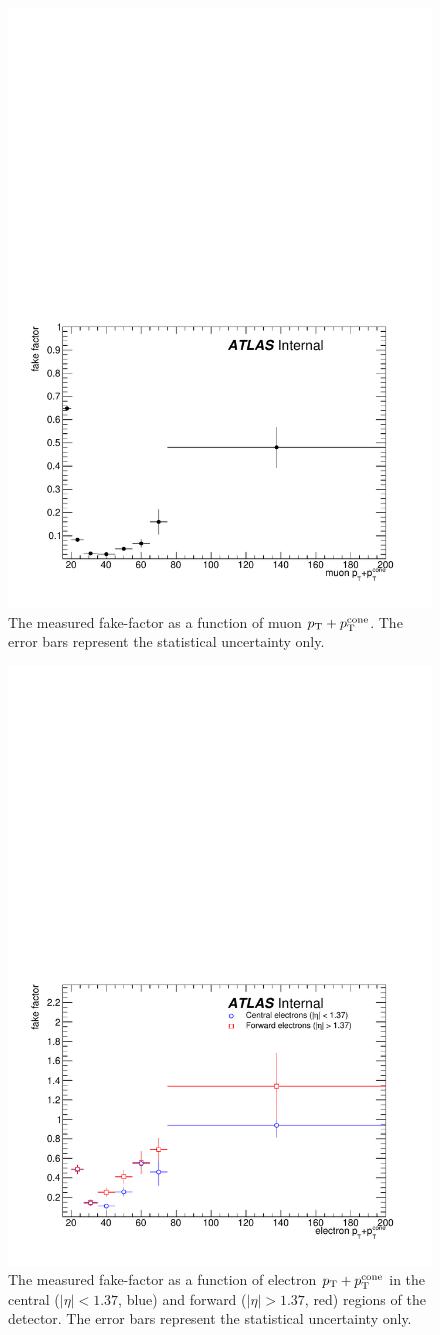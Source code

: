 \begin{figure}[htbp]
  \centering
  \includegraphics[width=.6\textwidth]{figs/ssww_13tev/backgrounds/ff/muon_ff}
  \caption{The measured fake-factor as a function of muon $p_{\mathrm{T}}+p_{\mathrm{T}}^{\textrm{cone}}$.  The error bars represent the statistical uncertainty only.}
  \label{fig:ssww13tev_ff_muon}
\end{figure}

\begin{figure}[htbp]
  \centering
  \includegraphics[width=.6\textwidth]{figs/ssww_13tev/backgrounds/ff/elec_ff}
  \caption{The measured fake-factor as a function of electron $p_{\mathrm{T}}+p_{\mathrm{T}}^{\textrm{cone}}$ in the central ($|\eta|<1.37$, blue) and forward ($|\eta| > 1.37$, red) regions of the detector.  The error bars represent the statistical uncertainty only.}
  \label{fig:ssww13tev_ff_elec}
\end{figure}

